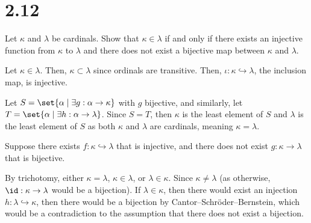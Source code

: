 \documentclass[10pt]{mypackage}
\begin{document}
\RaggedRight
\section{2.12}%
\begin{problem}
  Let $\kappa$ and $\lambda$ be cardinals. Show that $\kappa \in \lambda$ if and only if there exists an injective function from $\kappa$ to $\lambda$ and there does not exist a bijective map between $\kappa$ and $\lambda$.
\end{problem}
\begin{solution}
  Let $\kappa \in \lambda$. Then, $\kappa \subset \lambda$ since ordinals are transitive. Then, $\iota: \kappa \hookrightarrow \lambda$, the inclusion map, is injective.\newline

  Let $S = \set{\alpha\mid \exists g: \alpha \rightarrow \kappa}$ with $g$ bijective, and similarly, let $T = \set{\alpha\mid \exists h: \alpha \rightarrow \lambda}$. Since $S = T$, then $\kappa$ is the least element of $S$ and $\lambda$ is the least element of $S$ as both $\kappa$ and $\lambda$ are cardinals, meaning $\kappa = \lambda$.\newline

  Suppose there exists $f: \kappa \hookrightarrow \lambda$ that is injective, and there does not exist $g: \kappa \rightarrow \lambda$ that is bijective.\newline

  By trichotomy, either $\kappa = \lambda$, $\kappa \in \lambda$, or $\lambda\in \kappa$. Since $\kappa \neq \lambda$ (as otherwise, $\id: \kappa \rightarrow \lambda$ would be a bijection). If $\lambda \in \kappa$, then there would exist an injection $h: \lambda \hookrightarrow \kappa$, then there would be a bijection by Cantor--Schröder--Bernstein, which would be a contradiction to the assumption that there does not exist a bijection.
\end{solution}
\end{document}
